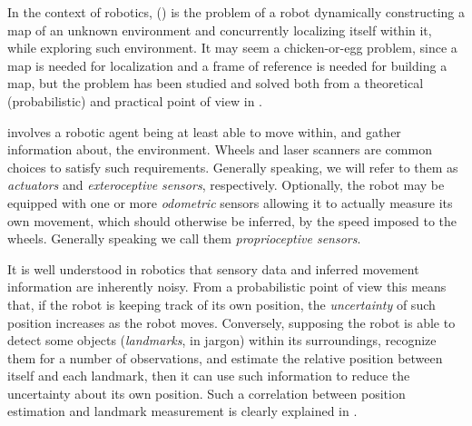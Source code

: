 In the context of robotics, \Slam{} (\SLAM) is the problem of a robot dynamically constructing a map of an unknown environment and concurrently localizing itself within it, while exploring such environment. 
It may seem a chicken-or-egg problem, since a map is needed for localization and a frame of reference is needed for building a map, but the problem has been studied and solved both from a theoretical (probabilistic) and practical point of view in \cite{thrun2005}.

\SLAM{} involves a robotic agent being at least able to move within, and gather information about, the environment. Wheels and laser scanners are common choices to satisfy such requirements. 
Generally speaking, we will refer to them as \emph{actuators} and \emph{exteroceptive sensors}, respectively. 
Optionally, the robot may be equipped with one or more \emph{odometric} sensors allowing it to actually measure its own movement, which should otherwise be inferred, \eg{} by the speed imposed to the wheels. 
Generally speaking we call them \emph{proprioceptive sensors}. 

It is well understood in robotics that sensory data and inferred movement information are inherently noisy. 
From a probabilistic point of view this means that, if the robot is keeping track of its own position, the \emph{uncertainty} of such position increases as the robot moves. 
Conversely, supposing the robot is able to detect some objects (\emph{landmarks}, in jargon) within its surroundings, recognize them for a number of observations, and estimate the relative position between itself and each landmark, then it can use such information to reduce the uncertainty about its own position.
Such a correlation between position estimation and landmark measurement is clearly explained in \cite[Unit C]{brenner204}.

